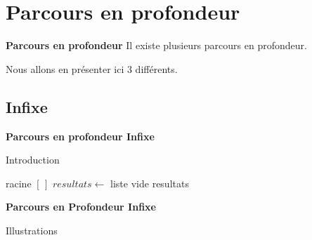 \documentclass{beamer}
\begin{document}
\section{Parcours en profondeur}
\begin{frame}{\textbf{Parcours en profondeur}}
    \qquad Il existe plusieurs parcours en profondeur. 
    \par\medskip
    \qquad Nous allons en présenter ici 3 différents. 
\end{frame}
\subsection{Infixe}
\begin{frame}{\textbf{Parcours en profondeur Infixe}}
    \begin{block}{Introduction}
        \begin{algorithm}[H]
            \footnotesize
            \caption{DFS Infixe}
            \begin{algorithmic}[1]
                \Require racine
                    \State \Return $[\,]$
                \Else
                    \State $resultats \gets$ liste vide
                    \State {}
                    \State \Return resultats
                \EndIf
            \end{algorithmic}
        \end{algorithm}
    \end{block}
\end{frame}
\begin{frame}{\textbf{Parcours en Profondeur Infixe}}
    \begin{block}{Illustrations}
        \centering
    \end{block}
\end{frame}
\end{document}
